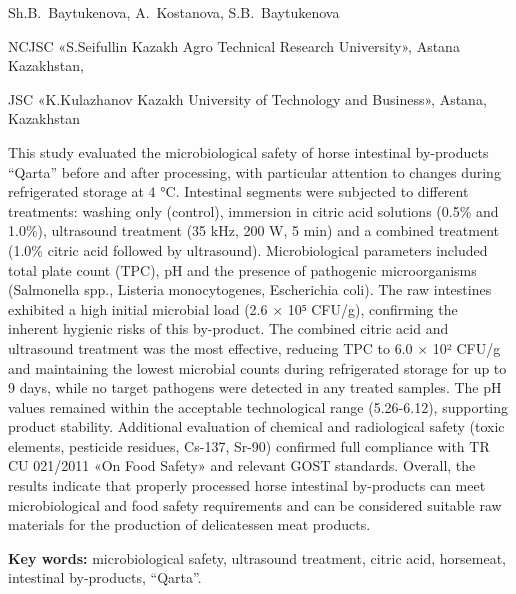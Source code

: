 
\begin{header}

Sh.B.~Baytukenova,
A.~Kostanova\envelope,
S.B.~Baytukenova
\end{header}

\begin{affil}
NCJSC «S.Seifullin Kazakh Agro Technical Research University», Astana Kazakhstan,

JSC «K.Kulazhanov Kazakh University of Technology and Business», Astana, Kazakhstan

\end{affil}

This study evaluated the microbiological safety of horse intestinal
by-products ``Qarta'' before and after processing, with particular
attention to changes during refrigerated storage at 4 °C. Intestinal
segments were subjected to different treatments: washing only (control),
immersion in citric acid solutions (0.5\% and 1.0\%), ultrasound
treatment (35 kHz, 200 W, 5 min) and a combined treatment (1.0\% citric
acid followed by ultrasound). Microbiological parameters included total
plate count (TPC), pH and the presence of pathogenic microorganisms
(Salmonella spp., Listeria monocytogenes, Escherichia coli). The raw
intestines exhibited a high initial microbial load (2.6 × 10⁵ CFU/g),
confirming the inherent hygienic risks of this by-product. The combined
citric acid and ultrasound treatment was the most effective, reducing
TPC to 6.0 × 10² CFU/g and maintaining the lowest microbial counts
during refrigerated storage for up to 9 days, while no target pathogens
were detected in any treated samples. The pH values remained within the
acceptable technological range (5.26-6.12), supporting product
stability. Additional evaluation of chemical and radiological safety
(toxic elements, pesticide residues, Cs-137, Sr-90) confirmed full
compliance with TR CU 021/2011 «On Food Safety» and relevant GOST
standards. Overall, the results indicate that properly processed horse
intestinal by-products can meet microbiological and food safety
requirements and can be considered suitable raw materials for the
production of delicatessen meat products.

{\bfseries Key words:} microbiological safety, ultrasound treatment, citric
acid, horsemeat, intestinal by-products, ``Qarta''.

